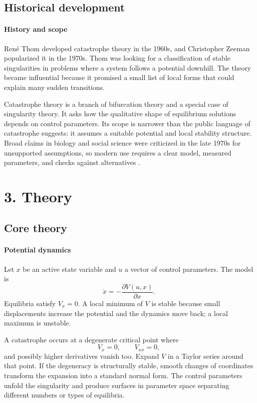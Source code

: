 \subsection*{Historical development}
\begin{historylist}
\paragraph{History and scope}

René Thom developed catastrophe theory in the 1960s, and Christopher Zeeman popularized it in the 1970s. Thom was looking for a classification of stable singularities in problems where a system follows a potential downhill. The theory became influential because it promised a small list of local forms that could explain many sudden transitions.

Catastrophe theory is a branch of bifurcation theory and a special case of singularity theory. It asks how the qualitative shape of equilibrium solutions depends on control parameters. Its scope is narrower than the public language of catastrophe suggests: it assumes a suitable potential and local stability structure. Broad claims in biology and social science were criticized in the late 1970s for unsupported assumptions, so modern use requires a clear model, measured parameters, and checks against alternatives \cite{catastrophe_theory_ref1,catastrophe_theory_ref3}.

\end{historylist}
\section*{3. Theory}
\subsection*{Core theory}
\paragraph{Potential dynamics}

Let $x$ be an active state variable and $u$ a vector of control parameters. The model is
\[
 \dot x=-\frac{\partial V(u,x)}{\partial x}.
\]
Equilibria satisfy $V_x=0$. A local minimum of $V$ is stable because small displacements increase the potential and the dynamics move back; a local maximum is unstable.

A catastrophe occurs at a degenerate critical point where
\[
 V_x=0,\qquad V_{xx}=0,
\]
and possibly higher derivatives vanish too. Expand $V$ in a Taylor series around that point. If the degeneracy is structurally stable, smooth changes of coordinates transform the expansion into a standard normal form. The control parameters unfold the singularity and produce surfaces in parameter space separating different numbers or types of equilibria.

